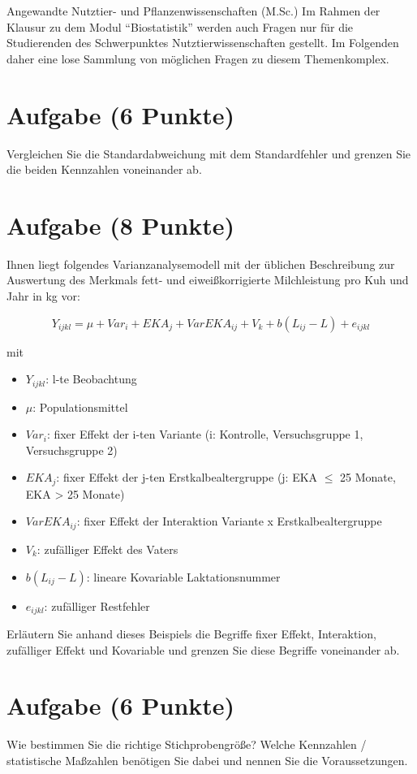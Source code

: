 \documentclass[a4paper, 10pt]{scrartcl}\usepackage[]{graphicx}\usepackage[]{xcolor}
\begin{document}
\clearpage
\begin{graybox}{Angewandte Nutztier- und Pflanzenwissenschaften (M.Sc.)}
  Im Rahmen der Klausur zu dem Modul "`Biostatistik"' werden auch Fragen
  nur f{\"u}r die Studierenden des Schwerpunktes Nutztierwissenschaften
  gestellt. Im Folgenden daher eine lose Sammlung von m{\"o}glichen Fragen zu
  diesem Themenkomplex.
\end{graybox}
\clearpage

\section{Aufgabe \hfill (6 Punkte)}
Vergleichen Sie die Standardabweichung mit dem Standardfehler und grenzen
Sie die beiden Kennzahlen voneinander ab.



\section{Aufgabe \hfill (8 Punkte)}
Ihnen liegt folgendes Varianzanalysemodell mit der {\"u}blichen Beschreibung
zur Auswertung des Merkmals fett- und eiwei{\ss}korrigierte Milchleistung pro
Kuh und Jahr in kg vor:

\begin{equation*}
  Y_{ijkl} = \mu + Var_i + EKA_j + VarEKA_{ij} + V_k + b(L_{ij} - L) + e_{ijkl}
\end{equation*}

mit

\begin{itemize}
\item $Y_{ijkl}$: l-te Beobachtung
\item $\mu$: Populationsmittel 
\item $Var_i$: fixer Effekt der i-ten Variante (i: Kontrolle,
  Versuchsgruppe 1, Versuchsgruppe 2)
\item $EKA_j$: fixer Effekt der j-ten Erstkalbealtergruppe (j: EKA $\leq$ 25
  Monate, EKA > 25 Monate)
\item $VarEKA_{ij}$: fixer Effekt der Interaktion Variante x
  Erstkalbealtergruppe 
\item $V_k$: zuf{\"a}lliger Effekt des Vaters 
\item $b(L_{ij} - L)$: lineare Kovariable Laktationsnummer 
\item $e_{ijkl}$: zuf{\"a}lliger
  Restfehler
\end{itemize}
Erl{\"a}utern Sie anhand dieses Beispiels die Begriffe fixer Effekt,
Interaktion, zuf{\"a}lliger Effekt und Kovariable und grenzen Sie diese
Begriffe voneinander ab.



\section{Aufgabe \hfill (6 Punkte)}
Wie bestimmen Sie die richtige Stichprobengr{\"o}{\ss}e? Welche Kennzahlen /
statistische Ma{\ss}zahlen ben{\"o}tigen Sie dabei und nennen Sie die
Voraussetzungen.

 
\end{document}
